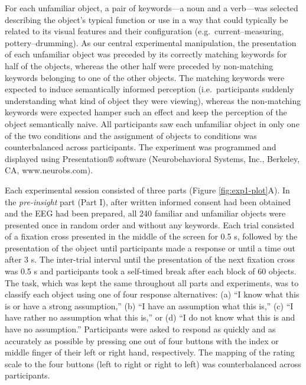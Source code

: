 \documentclass[
  english,
  man,11pt,floatsintext]{apa7}
\begin{document}
For each unfamiliar object, a pair of keywords---a noun and a verb---was selected describing the object's typical function or use in a way that could typically be related to its visual features and their configuration (e.g.~current--measuring, pottery--drumming). As our central experimental manipulation, the presentation of each unfamiliar object was preceded by its correctly matching keywords for half of the objects, whereas the other half were preceded by non-matching keywords belonging to one of the other objects. The matching keywords were expected to induce semantically informed perception (i.e.~participants suddenly understanding what kind of object they were viewing), whereas the non-matching keywords were expected hamper such an effect and keep the perception of the object semantically naive. All participants saw each unfamiliar object in only one of the two conditions and the assignment of objects to conditions was counterbalanced across participants. The experiment was programmed and displayed using Presentation® software (Neurobehavioral Systems, Inc., Berkeley, CA, www.neurobs.com).

Each experimental session consisted of three parts (Figure \ref{fig:exp1-plot}A). In the \emph{pre-insight} part (Part I), after written informed consent had been obtained and the EEG had been prepared, all 240 familiar and unfamiliar objects were presented once in random order and without any keywords. Each trial consisted of a fixation cross presented in the middle of the screen for 0.5 s, followed by the presentation of the object until participants made a response or until a time out after 3 s. The inter-trial interval until the presentation of the next fixation cross was 0.5 s and participants took a self-timed break after each block of 60 objects. The task, which was kept the same throughout all parts and experiments, was to classify each object using one of four response alternatives: (a) ``I know what this is or have a strong assumption,'' (b) ``I have an assumption what this is,'' (c) ``I have rather no assumption what this is,'' or (d) ``I do not know what this is and have no assumption.'' Participants were asked to respond as quickly and as accurately as possible by pressing one out of four buttons with the index or middle finger of their left or right hand, respectively. The mapping of the rating scale to the four buttons (left to right or right to left) was counterbalanced across participants.
\end{document}
